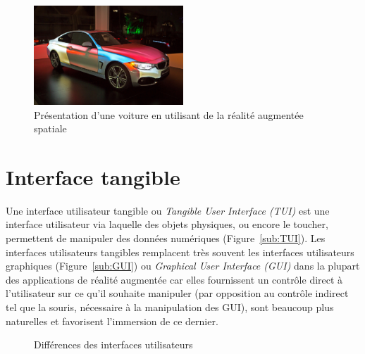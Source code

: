 \begin{figure}[H]
\centering
\includegraphics[width=0.5\textwidth]{images/SARMappingCar2}
\caption{Présentation d'une voiture en utilisant de la réalité augmentée spatiale\protect\footnotemark}
\label{fig:SAR}
\end{figure}

\section{Interface tangible}
\label{sec:tui}
Une interface utilisateur tangible\cite{ishii2008tangible} ou \emph{Tangible User Interface (TUI)} est une interface utilisateur via laquelle des objets physiques, ou encore le toucher, permettent de manipuler des données numériques (Figure~\ref{sub:TUI}). Les interfaces utilisateurs tangibles remplacent très souvent les interfaces utilisateurs graphiques (Figure~\ref{sub:GUI}) ou \emph{Graphical User Interface (GUI)} dans la plupart des applications de réalité augmentée car elles fournissent un contrôle direct à l'utilisateur sur ce qu'il souhaite manipuler (par opposition au contrôle indirect tel que la souris, nécessaire à la manipulation des GUI), sont beaucoup plus naturelles et favorisent l'immersion de ce dernier.

\begin{figure}[H]
    \centering
\caption{Différences des interfaces utilisateurs\protect\footnotemark}
\label{fig:GUITUI}
\end{figure}

